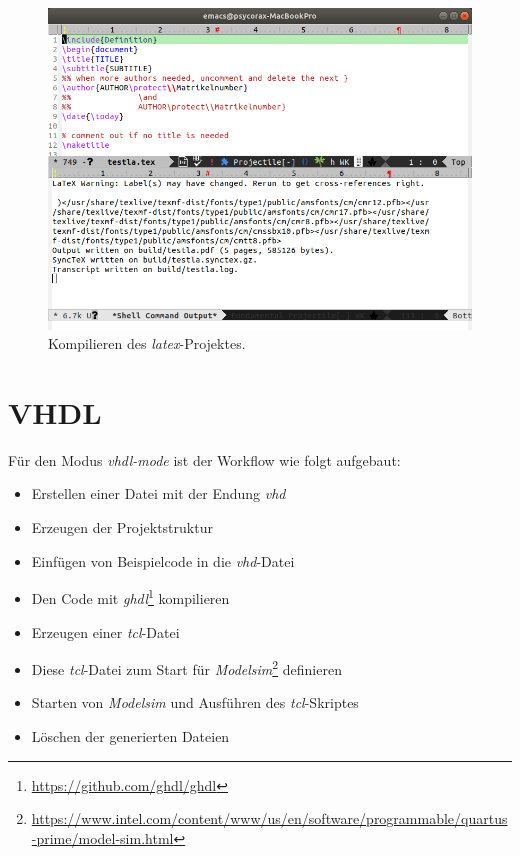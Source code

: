 \begin{figure}[h]
  \centering
  \includegraphics[width=.95\textwidth]{./images/Workflow/latex.png}
  \caption{\label{fig:latex} Kompilieren des \textit{latex}-Projektes.}
\end{figure}

\section{VHDL}
\label{sec:vhdl}
Für den Modus \textit{vhdl-mode} ist der Workflow wie folgt aufgebaut:
\begin{itemize}
\item Erstellen einer Datei mit der Endung \textit{vhd}
\item Erzeugen der Projektstruktur
\item Einfügen von Beispielcode in die \textit{vhd}-Datei
\item Den Code mit
  \textit{ghdl}\footnote{\url{https://github.com/ghdl/ghdl}}
  kompilieren
\item Erzeugen einer \textit{tcl}-Datei
\item Diese \textit{tcl}-Datei zum Start für
  \textit{Modelsim}\footnote{\url{https://www.intel.com/content/www/us/en/software/programmable/quartus-prime/model-sim.html}}
  definieren
\item Starten von \textit{Modelsim} und Ausführen des
  \textit{tcl}-Skriptes
\item Löschen der generierten Dateien
\end{itemize}

